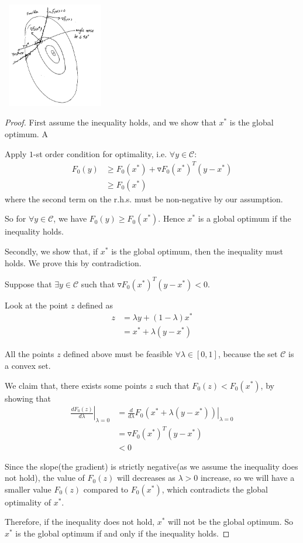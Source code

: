 \begin{marginfigure}
\centering
\includegraphics[width=1.8in,height=1.8in]{figures/ch09/figure1113_1.png}
\end{marginfigure}

\begin{proof}
	First assume the inequality holds, and we show that $x^*$ is the global optimum. A
	
	Apply $1$-st order condition for optimality, i.e. $\forall y \in \mathcal{C}$:
	\begin{align*}
	F_0(y) &\geq F_0(x^*) + \triangledown F_0(x^*)^T(y-x^*)\\
	&\geq F_0(x^*)
	\end{align*}
	where the second term on the r.h.s. must be non-negative by our assumption.
	
	So for $\forall y \in \mathcal{C}$, we have $F_0(y)\geq F_0(x^*)$. Hence $x^*$ is a global optimum if the inequality holds.
	
	Secondly, we show that, if $x^*$ is the global optimum, then the inequality must holds. We prove this by contradiction.
	
	Suppose that $\exists y\in \mathcal{C}$ such that $\triangledown F_0(x^*)^T(y-x^*)<0$.
	
	Look at the point $z$ defined as
	\begin{align*}
	z 
	&= \lambda y + (1-\lambda)x^*\\
	&= x^* + \lambda(y-x^*)
	\end{align*}
	
	All the points $z$ defined above must be feasible $\forall \lambda \in [0,1]$, because the set $\mathcal{C}$ is a convex set.
	
	We claim that, there exists some points $z$ such that $F_0(z)<F_0(x^*)$, by showing that
	\begin{align*}
	\left.\frac{dF_0(z)}{d\lambda}\right|_{\lambda = 0} &=\left.\frac{d}{d\lambda}F_0(x^*+\lambda(y-x^*))\right|_{\lambda = 0}\\
	&= \triangledown F_0(x^*)^T(y-x^*)\\
	&< 0
	\end{align*}
	
	Since the slope(the gradient) is strictly negative(as we assume the inequality does not hold), the value of $F_0(z)$ will decreases as $\lambda>0$ increase, so we will have a smaller value $F_0(z)$ compared to $F_0(x^*)$, which contradicts the global optimality of $x^*$.
	
	Therefore, if the inequality does not hold, $x^*$ will not be the global optimum. So $x^*$ is the global optimum if and only if the inequality holds.
\end{proof}


